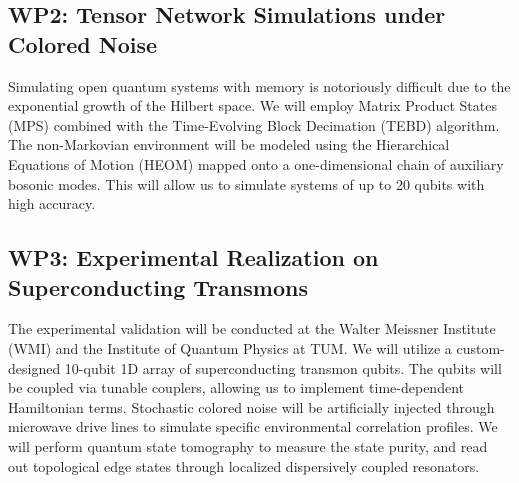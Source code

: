 \subsection{WP2: Tensor Network Simulations under Colored Noise}
Simulating open quantum systems with memory is notoriously difficult due to the exponential growth of the Hilbert space. We will employ Matrix Product States (MPS) combined with the Time-Evolving Block Decimation (TEBD) algorithm. The non-Markovian environment will be modeled using the Hierarchical Equations of Motion (HEOM) mapped onto a one-dimensional chain of auxiliary bosonic modes. This will allow us to simulate systems of up to 20 qubits with high accuracy.

\subsection{WP3: Experimental Realization on Superconducting Transmons}
The experimental validation will be conducted at the Walter Meissner Institute (WMI) and the Institute of Quantum Physics at TUM. We will utilize a custom-designed 10-qubit 1D array of superconducting transmon qubits. The qubits will be coupled via tunable couplers, allowing us to implement time-dependent Hamiltonian terms. 
\pbreak
Stochastic colored noise will be artificially injected through microwave drive lines to simulate specific environmental correlation profiles. We will perform quantum state tomography to measure the state purity, and read out topological edge states through localized dispersively coupled resonators.

\vspace{1.0em}
